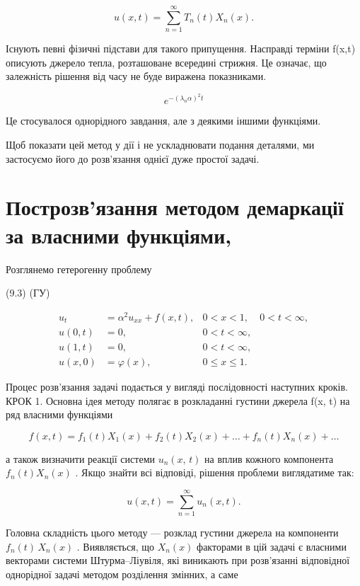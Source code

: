 \[
u(x, t) = \sum_{n=1}^{\infty} T_n(t) X_n(x).
\]

Існують певні фізичні підстави для такого припущення. Насправді терміни f(x,t) описують джерело тепла, розташоване всередині стрижня. Це означає, що залежність рішення від часу не буде виражена показниками.

\[
e^{-(\lambda_n\alpha)^2 t}
\]

Це стосувалося однорідного завдання, але з деякими іншими функціями.

Щоб показати цей метод у дії і не ускладнювати подання деталями, ми застосуємо його до розв'язання однієї дуже простої задачі.

\section{Построзв'язання методом демаркації за власними функціями,}\label{ux43fux43eux441ux442ux440ux43eux437ux432ux44fux437ux430ux43dux43dux44f-ux43cux435ux442ux43eux434ux43eux43c-ux434ux435ux43cux430ux440ux43aux430ux446ux456ux457-ux437ux430-ux432ux43bux430ux441ux43dux438ux43cux438-ux444ux443ux43dux43aux446ux456ux44fux43cux438}

Розглянемо гетерогенну проблему

(9.3) (ГУ)

\[
\begin{aligned} u_t &= \alpha^2 u_{xx} + f(x, t), & 0 < x < 1, & 0 < t < \infty, \\ u(0, t) &= 0, & 0 < t < \infty, \\ u(1, t) &= 0, & 0 < t < \infty, \\ u(x, 0) &= \varphi(x), & 0 \leqslant x \leqslant 1. \end{aligned}
\]

Процес розв'язання задачі подається у вигляді послідовності наступних кроків. КРОК 1. Основна ідея методу полягає в розкладанні густини джерела f(x, t) на ряд власними функціями

\[
f(x, t) = f_1(t) X_1(x) + f_2(t) X_2(x) + \dots + f_n(t) X_n(x) + \dots
\]

а також визначити реакції системи \(u_n\left(x,\,t\right)\) на вплив кожного компонента \(f_n\left(t\right)X_n\left(x\right)\) . Якщо знайти всі відповіді, рішення проблеми виглядатиме так:

\[
u(x, t) = \sum_{n=1}^{\infty} u_n(x, t).
\]

Головна складність цього методу --- розклад густини джерела на компоненти \(f_n(t)\,X_n(x)\) . Виявляється, що \(X_n(x)\) факторами в цій задачі є власними векторами системи Штурма--Ліувіля, які виникають при розв'язанні відповідної однорідної задачі методом розділення змінних, а саме

